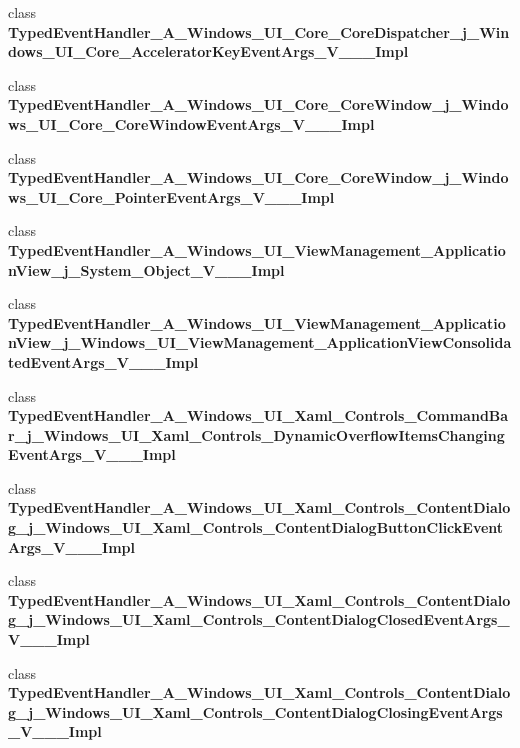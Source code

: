 \begin{DoxyCompactItemize}
\item 
class {\bfseries Typed\+Event\+Handler\+\_\+\+A\+\_\+\+Windows\+\_\+\+U\+I\+\_\+\+Core\+\_\+\+Core\+Dispatcher\+\_\+j\+\_\+\+Windows\+\_\+\+U\+I\+\_\+\+Core\+\_\+\+Accelerator\+Key\+Event\+Args\+\_\+\+V\+\_\+\+\_\+\+\_\+\+Impl}
\item 
class {\bfseries Typed\+Event\+Handler\+\_\+\+A\+\_\+\+Windows\+\_\+\+U\+I\+\_\+\+Core\+\_\+\+Core\+Window\+\_\+j\+\_\+\+Windows\+\_\+\+U\+I\+\_\+\+Core\+\_\+\+Core\+Window\+Event\+Args\+\_\+\+V\+\_\+\+\_\+\+\_\+\+Impl}
\item 
class {\bfseries Typed\+Event\+Handler\+\_\+\+A\+\_\+\+Windows\+\_\+\+U\+I\+\_\+\+Core\+\_\+\+Core\+Window\+\_\+j\+\_\+\+Windows\+\_\+\+U\+I\+\_\+\+Core\+\_\+\+Pointer\+Event\+Args\+\_\+\+V\+\_\+\+\_\+\+\_\+\+Impl}
\item 
class {\bfseries Typed\+Event\+Handler\+\_\+\+A\+\_\+\+Windows\+\_\+\+U\+I\+\_\+\+View\+Management\+\_\+\+Application\+View\+\_\+j\+\_\+\+System\+\_\+\+Object\+\_\+\+V\+\_\+\+\_\+\+\_\+\+Impl}
\item 
class {\bfseries Typed\+Event\+Handler\+\_\+\+A\+\_\+\+Windows\+\_\+\+U\+I\+\_\+\+View\+Management\+\_\+\+Application\+View\+\_\+j\+\_\+\+Windows\+\_\+\+U\+I\+\_\+\+View\+Management\+\_\+\+Application\+View\+Consolidated\+Event\+Args\+\_\+\+V\+\_\+\+\_\+\+\_\+\+Impl}
\item 
class {\bfseries Typed\+Event\+Handler\+\_\+\+A\+\_\+\+Windows\+\_\+\+U\+I\+\_\+\+Xaml\+\_\+\+Controls\+\_\+\+Command\+Bar\+\_\+j\+\_\+\+Windows\+\_\+\+U\+I\+\_\+\+Xaml\+\_\+\+Controls\+\_\+\+Dynamic\+Overflow\+Items\+Changing\+Event\+Args\+\_\+\+V\+\_\+\+\_\+\+\_\+\+Impl}
\item 
class {\bfseries Typed\+Event\+Handler\+\_\+\+A\+\_\+\+Windows\+\_\+\+U\+I\+\_\+\+Xaml\+\_\+\+Controls\+\_\+\+Content\+Dialog\+\_\+j\+\_\+\+Windows\+\_\+\+U\+I\+\_\+\+Xaml\+\_\+\+Controls\+\_\+\+Content\+Dialog\+Button\+Click\+Event\+Args\+\_\+\+V\+\_\+\+\_\+\+\_\+\+Impl}
\item 
class {\bfseries Typed\+Event\+Handler\+\_\+\+A\+\_\+\+Windows\+\_\+\+U\+I\+\_\+\+Xaml\+\_\+\+Controls\+\_\+\+Content\+Dialog\+\_\+j\+\_\+\+Windows\+\_\+\+U\+I\+\_\+\+Xaml\+\_\+\+Controls\+\_\+\+Content\+Dialog\+Closed\+Event\+Args\+\_\+\+V\+\_\+\+\_\+\+\_\+\+Impl}
\item 
class {\bfseries Typed\+Event\+Handler\+\_\+\+A\+\_\+\+Windows\+\_\+\+U\+I\+\_\+\+Xaml\+\_\+\+Controls\+\_\+\+Content\+Dialog\+\_\+j\+\_\+\+Windows\+\_\+\+U\+I\+\_\+\+Xaml\+\_\+\+Controls\+\_\+\+Content\+Dialog\+Closing\+Event\+Args\+\_\+\+V\+\_\+\+\_\+\+\_\+\+Impl}

\end{DoxyCompactItemize}
